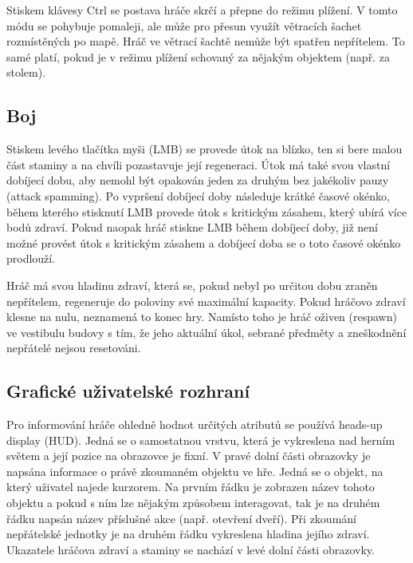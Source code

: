 \documentclass[FM,Proj,bw]{tulthesis}
\begin{document}
	Stiskem klávesy Ctrl se postava hráče skrčí a přepne do režimu plížení. V tomto módu se pohybuje pomaleji, ale může pro přesun využít větracích šachet rozmístěných po mapě. Hráč ve větrací šachtě nemůže být spatřen nepřítelem. To samé platí, pokud je v režimu plížení schovaný za nějakým objektem (např. za stolem).
	
	\subsection{Boj} %
	
	Stiskem levého tlačítka myši (LMB) se provede útok na blízko, ten si bere malou část staminy a na chvíli pozastavuje její regeneraci. Útok má také svou vlastní dobíjecí dobu, aby nemohl být opakován jeden za druhým bez jakékoliv pauzy (attack spamming). Po vypršení dobíjecí doby následuje krátké časové okénko, během kterého stisknutí LMB provede útok s kritickým zásahem, který ubírá více bodů zdraví. Pokud naopak hráč stiskne LMB během dobíjecí doby, již není možné provést útok s kritickým zásahem a dobíjecí doba se o toto časové okénko prodlouží.
	
	Hráč má svou hladinu zdraví, která se, pokud nebyl po určitou dobu zraněn nepřítelem, regeneruje do poloviny své maximální kapacity. Pokud hráčovo zdraví klesne na nulu, neznamená to konec hry. Namísto toho je hráč oživen (respawn) ve vestibulu budovy s tím, že jeho aktuální úkol, sebrané předměty a zneškodnění nepřátelé nejsou resetováni.
		
	\subsection{Grafické uživatelské rozhraní} %
	
	Pro informování hráče ohledně hodnot určitých atributů se používá heads-up display (HUD). Jedná se o samostatnou vrstvu, která je vykreslena nad herním světem a její pozice na obrazovce je fixní. V pravé dolní části obrazovky je napsána informace o právě zkoumaném objektu ve hře. Jedná se o objekt, na který uživatel najede kurzorem. Na prvním řádku je zobrazen název tohoto objektu a pokud s ním lze nějakým způsobem interagovat, tak je na druhém řádku napsán název příslušné akce (např. otevření dveří). Při zkoumání nepřátelské jednotky je na druhém řádku vykreslena hladina jejího zdraví. Ukazatele hráčova zdraví a staminy se nachází v levé dolní části obrazovky.
	
\end{document}
